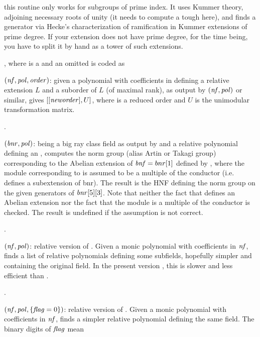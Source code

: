  this routine only works for subgroups of prime index. It
uses Kummer theory, adjoining necessary roots of unity (it needs to compute a
tough  here), and finds a generator via Hecke's characterization
of ramification in Kummer extensions of prime degree. If your extension does
not have prime degree, for the time being, you have to split it by hand as a
tower of such extensions.

, where
 is a  and an omitted  is coded as

$(\hbox{\it nf\/},\hbox{\it pol\/},\hbox{\it order\/})$: given a polynomial
 with coefficients in  defining a relative extension $L$ and
a suborder  of $L$ (of maximal rank), as output by
$(\hbox{\it nf\/},\hbox{\it pol\/})$ or similar, gives
$[[\hbox{\it neworder\/}],U]$, where  is a reduced order and $U$ is
the unimodular transformation matrix.

.

$(\hbox{\it bnr\/},\hbox{\it pol\/})$:  being a big ray
class field as output by  and  a relative polynomial
defining an , computes the norm group (alias Artin
or Takagi group) corresponding to the Abelian extension of $\hbox{\it bnf\/}=bnr[1]$
defined by , where the module corresponding to  is assumed
to be a multiple of the conductor (i.e.~ defines a subextension of
bnr). The result is the HNF defining the norm group on the given generators
of $\hbox{\it bnr\/}[5][3]$. Note that neither the fact that  defines an
Abelian extension nor the fact that the module is a multiple of the conductor
is checked. The result is undefined if the assumption is not correct.

.

$(\hbox{\it nf\/},\hbox{\it pol\/})$: relative version of .
Given a monic polynomial  with coefficients in $\hbox{\it nf\/}$, finds a
list of relative polynomials defining some subfields, hopefully simpler and
containing the original field. In the present version \vers, this is slower
and less efficient than .

.

$(\hbox{\it nf\/},\hbox{\it pol\/},\{\hbox{\it f\kern0pt lag\/}=0\})$: relative version of
. Given a monic polynomial  with coefficients in
$\hbox{\it nf\/}$, finds a simpler relative polynomial defining the same field. The
binary digits of $\hbox{\it f\kern0pt lag\/}$ mean

